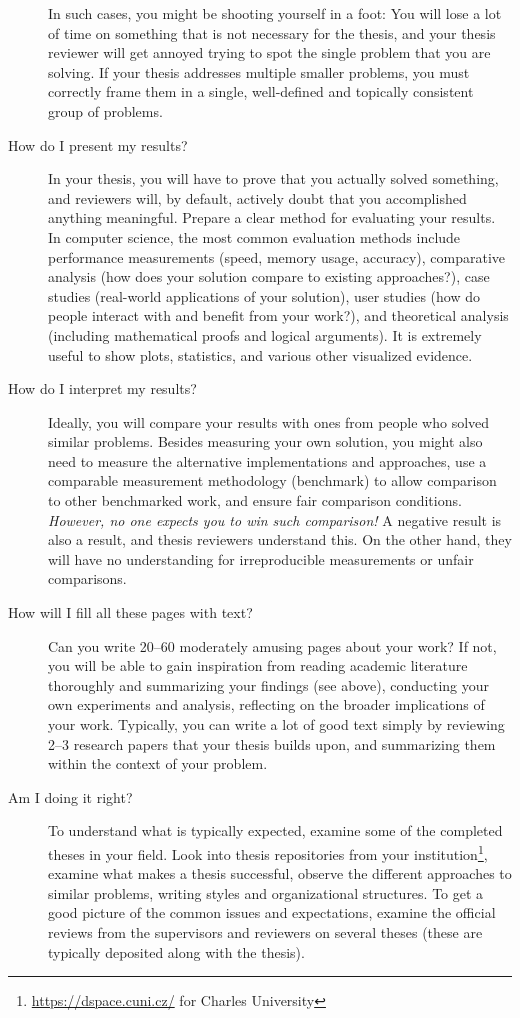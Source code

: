 \begin{description}
In such cases, you might be shooting yourself in a foot: You will lose a lot of time on something that is not necessary for the thesis, and your thesis reviewer will get annoyed trying to spot the single problem that you are solving. If your thesis addresses multiple smaller problems, you must correctly frame them in a single, well-defined and topically consistent group of problems.
\item[How do I present my results?]
In your thesis, you will have to prove that you actually solved something, and reviewers will, by default, actively doubt that you accomplished anything meaningful. Prepare a clear method for evaluating your results. In computer science, the most common evaluation methods include performance measurements (speed, memory usage, accuracy), comparative analysis (how does your solution compare to existing approaches?), case studies (real-world applications of your solution), user studies (how do people interact with and benefit from your work?), and theoretical analysis (including mathematical proofs and logical arguments). It is extremely useful to show plots, statistics, and various other visualized evidence.
\item[How do I interpret my results?]
Ideally, you will compare your results with ones from people who solved similar problems. Besides measuring your own solution, you might also need to measure the alternative implementations and approaches, use a comparable measurement methodology (benchmark) to allow comparison to other benchmarked work, and ensure fair comparison conditions. \emph{However, no one expects you to win such comparison!} A negative result is also a result, and thesis reviewers understand this. On the other hand, they will have no understanding for irreproducible measurements or unfair comparisons.
\item[How will I fill all these pages with text?]
Can you write 20--60 moderately amusing pages about your work? If not, you will be able to gain inspiration from reading academic literature thoroughly and summarizing your findings (see above), conducting your own experiments and analysis, reflecting on the broader implications of your work. Typically, you can write a lot of good text simply by reviewing 2--3 research papers that your thesis builds upon, and summarizing them within the context of your problem.
\item[Am I doing it right?]
To understand what is typically expected, examine some of the completed theses in your field. Look into thesis repositories from your institution\footnote{\url{https://dspace.cuni.cz/} for Charles University}, examine what makes a thesis successful, observe the different approaches to similar problems, writing styles and organizational structures. To get a good picture of the common issues and expectations, examine the official reviews from the supervisors and reviewers on several theses (these are typically deposited along with the thesis).

\end{description}
